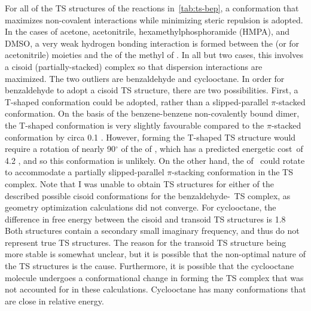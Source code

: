 \begin{doublespace}
For all of the TS structures of the reactions in~\ref{tab:ts-bep}, a
conformation that maximizes non-covalent interactions while minimizing steric
repulsion is adopted. In the cases of acetone, acetonitrile,
hexamethylphosphoramide (HMPA), and DMSO, a very weak hydrogen bonding
interaction is formed between the  (or  for acetonitrile)
moieties and the  of the methyl of \cumo. In all but two cases, this
involves a cisoid (partially-stacked) complex so that dispersion interactions
are maximized. The two outliers are benzaldehyde and cyclooctane. In order for
benzaldehyde to adopt a cisoid TS structure, there are two possibilities. First,
a T-shaped conformation could be adopted, rather than a slipped-parallel
$\pi$-stacked conformation. On the basis of the benzene-benzene non-covalently
bound dimer,\cite{Sinnokrot2002} the T-shaped conformation is very slightly
favourable compared to the $\pi$-stacked conformation by circa 0.1 \kcalmol.
However, forming the T-shaped TS structure would require a rotation of nearly
90$^\circ$ of the  of \cumo, which has a predicted energetic
cost\footnotemark\ of 4.2 \kcalmol, and so this conformation is unlikely. On the
other hand, the  of \cumo\ could rotate to accommodate a
partially slipped-parallel $\pi$-stacking conformation in the TS complex. Note
that I was unable to obtain TS structures for either of the described possible
cisoid conformations for the benzaldehyde-\cumo\ TS complex, as geometry
optimization calculations did not converge. For cyclooctane, the difference in
free energy between the cisoid and transoid TS structures is 1.8 \kcalmol
Both structures contain a secondary small imaginary frequency, and thus
do not represent true TS structures. The reason for the transoid TS structure
being more stable is somewhat unclear, but it is possible that the non-optimal
nature of the TS structures is the cause. Furthermore, it is possible that the
cyclooctane molecule undergoes a conformational change in forming the TS complex
that was not accounted for in these calculations. Cyclooctane has many
conformations that are close in relative energy.\cite{Dorofeeva1985}



\end{doublespace}
